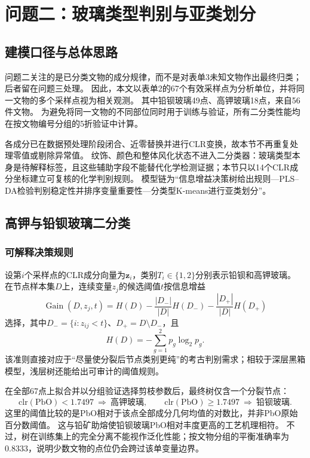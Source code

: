 \section{问题二：玻璃类型判别与亚类划分}
\label{sec:problem2}

\subsection{建模口径与总体思路}
问题二关注的是已分类文物的成分规律，而不是对表单3未知文物作出最终归类；后者留在问题三处理。
因此，本文以表单2的67个有效采样点为分析单位，并将同一文物的多个采样点视为相关观测。
其中铅钡玻璃49点、高钾玻璃18点，来自56件文物。
为避免将同一文物的不同部位同时用于训练与验证，所有二分类性能均在按文物编号分组的5折验证中计算。

各成分已在数据预处理阶段闭合、近零替换并进行CLR变换，故本节不再重复处理零值或剔除异常值。
纹饰、颜色和整体风化状态不进入二分类器：玻璃类型本身是待解释标签，且这些辅助字段不能替代化学检测证据；本节只以14个CLR成分坐标建立可复核的化学判别规则。
模型链为“信息增益决策树给出规则---PLS--DA检验判别稳定性并排序变量重要性---分类型K-means进行亚类划分”。

\subsection{高钾与铅钡玻璃二分类}
\subsubsection{可解释决策规则}
设第$i$个采样点的CLR成分向量为$\bm z_i$，类别$T_i\in\{1,2\}$分别表示铅钡和高钾玻璃。
在节点样本集$D$上，连续变量$z_j$的候选阈值$t$按信息增益
\begin{equation}
    \operatorname{Gain}(D,z_j,t)=H(D)-\frac{|D_-|}{|D|}H(D_-)-\frac{|D_+|}{|D|}H(D_+)
\end{equation}
选择，其中$D_-=\{i:z_{ij}<t\}$、$D_+=D\setminus D_-$，且
\begin{equation}
    H(D)=-\sum_{g=1}^{2}p_g\log_2p_g.
\end{equation}
该准则直接对应于“尽量使分裂后节点类别更纯”的考古判别需求；相较于深层黑箱模型，浅层树还能给出可审计的阈值规则\cite{breiman1984}。

在全部67点上拟合并以分组验证选择剪枝参数后，最终树仅含一个分裂节点：
\begin{equation}
    \mathrm{clr}(\mathrm{PbO})<1.7497\ \Rightarrow\ \text{高钾玻璃},\qquad
    \mathrm{clr}(\mathrm{PbO})\geq1.7497\ \Rightarrow\ \text{铅钡玻璃}.
    \label{eq:p2-tree-rule}
\end{equation}
这里的阈值比较的是PbO相对于该点全部成分几何均值的对数比，并非PbO原始百分数阈值。
这与铅矿助熔使铅钡玻璃PbO相对丰度更高的工艺机理相符。
不过，树在训练集上的完全分离不能视作泛化性能；按文物分组的平衡准确率为0.8333，说明少数文物的点位仍会跨过该单变量边界。

